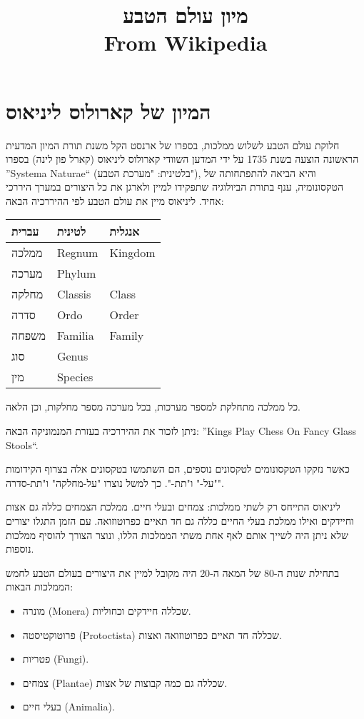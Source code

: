 \documentclass{article}
\title{מיון עולם הטבע\\\large From Wikipedia}
\begin{document}
\maketitle

\tableofcontents

\section{המיון של קארולוס ליניאוס}

חלוקת עולם הטבע לשלוש ממלכות, בספרו של ארנסט הקל משנת
תורת המיון המדעית הראשונה הוצעה בשנת 1735 על ידי המדען השוודי קארולוס
ליניאוס (קארל פון לינה) בספרו ”Systema Naturae“ (בלטינית: "מערכת
הטבע"), והיא הביאה להתפתחותה של הטקסונומיה, ענף בתורת הביולוגיה שתפקידו
למיין ולארגן את כל היצורים במערך היררכי אחיד. ליניאוס מיין את עולם הטבע
לפי ההיררכיה הבאה:

\begin{center}
  \begin{tabular}{lll}
    \hline
    עברית	 & לטינית	  & אנגלית   \\
    \hline
    ממלכה	& Regnum	  & Kingdom \\
    מערכה	& Phylum   &         \\
    מחלקה	& Classis	 & Class   \\
    סדרה	& Ordo	 & Order   \\
    משפחה	& Familia	 & Family  \\
    סוג	& Genus    &         \\
    מין	& Species  &         \\
    \hline
  \end{tabular}
\end{center}

כל ממלכה מתחלקת למספר מערכות, בכל מערכה מספר מחלקות, וכן הלאה.

ניתן לזכור את ההיררכיה בעזרת המנמוניקה הבאה: ”Kings Play Chess On Fancy
Glass Stools“.

כאשר נזקקו הטקסונומים לטקסונים נוספים, הם השתמשו בטקסונים אלה בצרוף
הקידומות "על-" ו"תת-". כך למשל נוצרו "על-מחלקה" ו"תת-סדרה".

ליניאוס התייחס רק לשתי ממלכות: צמחים ובעלי חיים. ממלכת הצמחים כללה גם
אצות וחיידקים ואילו ממלכת בעלי החיים כללה גם חד תאיים כפרוטוזואה. עם
הזמן התגלו יצורים שלא ניתן היה לשייך אותם לאף אחת משתי הממלכות הללו,
ונוצר הצורך להוסיף ממלכות נוספות.

בתחילת שנות ה-80 של המאה ה-20 היה מקובל למיין את היצורים בעולם הטבע
לחמש הממלכות הבאות:

\begin{itemize}
  \item מונרה (Monera) שכללה חיידקים וכחוליות.
  \item פרוטוקטיסטה (Protoctista) שכללה חד תאיים כפרוטוזואה ואצות.
  \item פטריות (Fungi).
  \item צמחים (Plantae) שכללה גם כמה קבוצות של אצות.
  \item בעלי חיים (Animalia).
\end{itemize}
\end{document}
